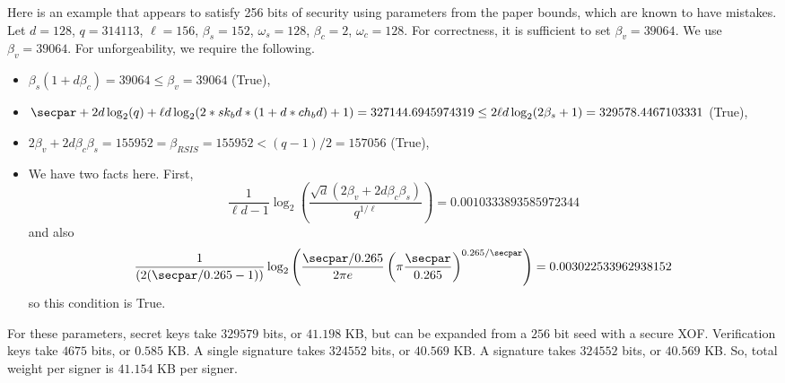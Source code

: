 \begin{example}
Here is an example that appears to satisfy 256 bits of security using parameters from the paper bounds, which are known to have mistakes.
Let $d = 128$, $q = 314113$, $\ell = 156$, $\beta_s = 152$, $\omega_s = 128$, $\beta_c = 2$, $\omega_c = 128$.
For correctness, it is sufficient to set $\beta_v = 39064$. We use $\beta_v = 39064$.
For unforgeability, we require the following.
\begin{itemize}
\item $\beta_s(1+d\beta_c) = 39064\leq \beta_v = 39064$ (True),
\item $\secpar + 2d \log_2(q) + \ell d \log_2(2*sk_bd*(1+d*ch_bd)+1)= 327144.6945974319\leq 2\ell d \log_2(2\beta_s + 1) = 329578.4467103331$ (True),
\item $2\beta_v + 2d\beta_c \beta_s = 155952 = \beta_{RSIS} = 155952< (q-1)/2 = 157056$ (True),
\item We have two facts here. First, \[\frac{1}{\ell d - 1}\log_2\left(\frac{\sqrt{d}(2\beta_v + 2d\beta_c \beta_s)}{q^{1/\ell}}\right) = 0.0010333893585972344\]and also \[\frac{1}{(2(\secpar/0.265 - 1))}\log_2\left(\frac{\secpar/0.265}{2\pi e}\left(\pi \frac{\secpar}{0.265}\right)^{0.265/\secpar}\right) = 0.003022533962938152\]so this condition is True.
\end{itemize}
For these parameters, secret keys take $329579$ bits, or $41.198$ KB, but can be expanded from a $256$ bit seed with a secure XOF.  Verification keys take $4675$ bits, or $0.585$ KB. A single signature takes $324552$ bits, or $40.569$ KB.  A signature takes $324552$ bits, or $40.569$ KB.  So, total weight per signer is $41.154$ KB per signer.
\end{example}

